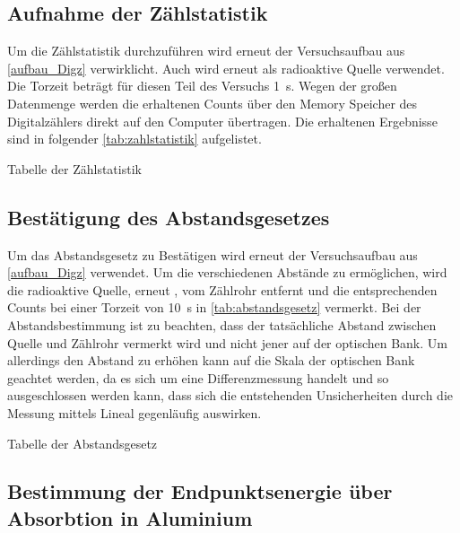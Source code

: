 \documentclass[12pt,english,ngerman]{scrartcl}
\begin{document}
\subsection{Aufnahme der Zählstatistik}

Um die Zählstatistik durchzuführen wird erneut der Versuchsaufbau aus
\autoref{aufbau_Digz} verwirklicht. Auch wird erneut  als
radioaktive Quelle verwendet. Die Torzeit beträgt für diesen Teil des Versuchs
\SI{1}{\second}. Wegen der großen Datenmenge werden die erhaltenen Counts über
den Memory Speicher des Digitalzählers direkt auf den Computer übertragen. Die
erhaltenen Ergebnisse sind in folgender \autoref{tab:zahlstatistik}
aufgelistet.


\begin{table}[H]
  \caption{Tabelle der Zählstatistik}
  \label{tab:zahlstatistik}
  \begin{center}
    
  \end{center}
\end{table}


\subsection{Bestätigung des Abstandsgesetzes}

Um das Abstandsgesetz zu Bestätigen wird erneut der Versuchsaufbau aus
\autoref{aufbau_Digz} verwendet. Um die verschiedenen Abstände zu ermöglichen,
wird die radioaktive Quelle, erneut , vom Zählrohr entfernt
und die entsprechenden Counts bei einer Torzeit von \SI{10}{\second} in
\autoref{tab:abstandsgesetz} vermerkt. Bei der Abstandsbestimmung ist zu
beachten, dass der tatsächliche Abstand zwischen Quelle und Zählrohr vermerkt
wird und nicht jener auf der optischen Bank. Um allerdings den Abstand zu
erhöhen kann auf die Skala der optischen Bank geachtet werden, da es sich um
eine Differenzmessung handelt und so ausgeschlossen werden kann, dass sich die
entstehenden Unsicherheiten durch die Messung mittels Lineal gegenläufig
auswirken.

\begin{table}[H]
  \caption{Tabelle der Abstandsgesetz}
  \label{tab:abstandsgesetz}
  \begin{center}
    
  \end{center}
\end{table}


\subsection{Bestimmung der Endpunktsenergie über Absorbtion in Aluminium}
\end{document}
